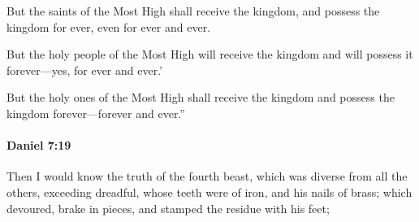 			\begin{versebox}
					\item[BHS] 
					\item[LXX] 
					\item[ASV] But the saints of the Most High shall receive the kingdom, and possess the kingdom for ever, even for ever and ever.
					\item[NIV] But the holy people of the Most High will receive the kingdom and will possess it forever—yes, for ever and ever.’
					\item[NRSV] But the holy ones of the Most High shall receive the kingdom and possess the kingdom forever—forever and ever.”
			\end{versebox}

		\paragraph{Daniel 7:19} %
			\label{DANIEL-7-19}

			Then I would know the truth of the fourth beast, which was diverse from all the others, exceeding dreadful, whose teeth were of iron, and his nails of brass; which devoured, brake in pieces, and stamped the residue with his feet;


